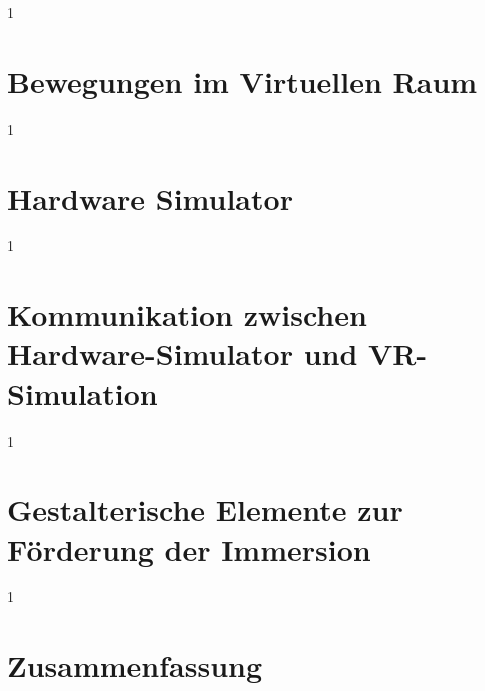 \documentclass[12pt,a4paper,titlepage,listof=totoc,bibliography=totoc,chapteratlists=0pt]{scrreprt}
\begin{document}
\begin{spacing}{1}
\chapter{Bewegungen im Virtuellen Raum}\label{chapter:cyber_sickness}
\end{spacing}


\begin{spacing}{1}
\chapter{Hardware Simulator}\label{chapter:hardware-prototyp}
\end{spacing}


\begin{spacing}{1}
\chapter{Kommunikation zwischen Hardware-Simulator und VR-Simulation}\label{chapter:communication_vr_hardware}
\end{spacing}


\begin{spacing}{1}
\chapter{Gestalterische Elemente zur Förderung der Immersion}\label{chapter:immersion}
\end{spacing}


\begin{spacing}{1}
\chapter{Zusammenfassung}
\end{spacing}


\setcounter{page}{\value{RPages}}
\glsnogroupskiptrue
{}
{
	\printglossary[title=Glossar,toctitle=Glossar] %
}
{
	\printglossary[title=Glossary,toctitle=Glossary] %
}
\listoffigures
\lstlistoflistings
\end{document}
